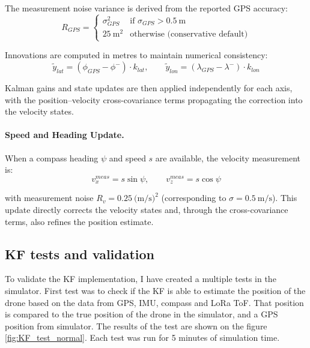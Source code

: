     The measurement noise variance is derived from the reported GPS accuracy:
    \begin{equation}
        R_{GPS} =
        \begin{cases}
            \sigma_{GPS}^2 & \text{if } \sigma_{GPS} > 0.5\ \text{m} \\
            25\ \text{m}^2 & \text{otherwise (conservative default)}
        \end{cases}
    \end{equation}

    Innovations are computed in metres to maintain numerical consistency:
    \begin{equation}
        \tilde{y}_{lat} = (\phi_{GPS} - \phi^-) \cdot k_{lat}, \qquad
        \tilde{y}_{lon} = (\lambda_{GPS} - \lambda^-) \cdot k_{lon}
    \end{equation}

    Kalman gains and state updates are then applied independently for each
    axis, with the position--velocity cross-covariance terms propagating
    the correction into the velocity states.

    \paragraph{Speed and Heading Update.}
    When a compass heading $\psi$ and speed $s$ are available, the
    velocity measurement is:
    \begin{equation}
        v_x^{meas} = s \sin\psi, \qquad v_z^{meas} = s \cos\psi
    \end{equation}

    with measurement noise $R_v = 0.25\ \text{(m/s)}^2$ (corresponding to
    $\sigma = 0.5\ \text{m/s}$). This update directly corrects the velocity
    states and, through the cross-covariance terms, also refines the
    position estimate.



\subsection{KF tests and validation}

    To validate the KF implementation, I have created a multiple tests in the simulator. First test was to check if the KF is able to estimate the position of the drone based on the data from GPS, IMU, compass and LoRa ToF. That position is compared to the true position of the drone in the simulator, and a GPS position from simulator. The results of the test are shown on the figure \ref{fig:KF_test_normal}. Each test was run for 5 minutes of simulation time.


